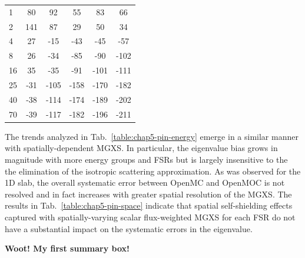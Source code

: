 \begin{table}[h!]
\begin{tabular}{a S[table-format=6.1] S[table-format=6.1] S[table-format=6.1] S[table-format=6.1] S[table-format=6.1]}
1 & 80 & 92 & 55 & 83 & 66 \\
2 & 141 & 87 & 29 & 50 & 34 \\
4 & 27 & -15 & -43 & -45 & -57 \\
8 & 26 & -34 & -85 & -90 & -102 \\
16 & 35 & -35 & -91 & -101 & -111 \\
25 & -31 & -105 & -158 & -170 & -182 \\
40 & -38 & -114 & -174 & -189 & -202 \\
70 & -39 & -117 & -182 & -196 & {} -211 \\
  \bottomrule
\end{tabular}
\end{table}

The trends analyzed in Tab.~\ref{table:chap5-pin-energy} emerge in a similar manner with spatially-dependent \ac{MGXS}. In particular, the eigenvalue bias grows in magnitude with more energy groups and \ac{FSR}s but is largely insensitive to the the elimination of the isotropic scattering approximation. As was observed for the 1D slab, the overall systematic error between OpenMC and OpenMOC is not resolved and in fact increases with greater spatial resolution of the \ac{MGXS}. The results in Tab.~\ref{table:chap5-pin-space} indicate that spatial self-shielding effects captured with spatially-varying scalar flux-weighted MGXS for each FSR do not have a substantial impact on the systematic errors in the eigenvalue.


\vspace{0.5cm}
\begin{emphbox}
\textbf{Woot! My first summary box!}
\end{emphbox}




